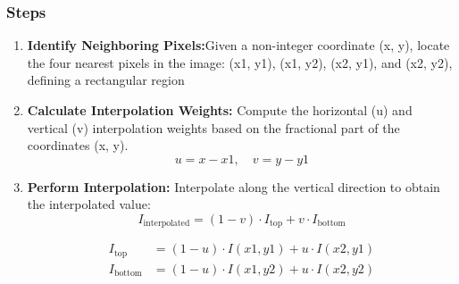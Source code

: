 \subsubsection{Steps}
\begin{enumerate}
    \item \textbf{Identify Neighboring Pixels:}Given a non-integer coordinate (x, y), locate the four nearest pixels in the image: (x1, y1), (x1, y2), (x2, y1), and (x2, y2), defining a rectangular region 

    \item \textbf{Calculate Interpolation Weights:} Compute the horizontal (u) and vertical (v) interpolation weights based on the fractional part of the coordinates (x, y).
        \[
    u = x - x1, \quad v = y - y1
    \]

    \item \textbf{Perform Interpolation:} Interpolate along the vertical direction to obtain the interpolated value:
    \[
    I_{\text{interpolated}} = (1 - v) \cdot I_{\text{top}} + v \cdot I_{\text{bottom}}
    \]

    \begin{align*}
    I_{\text{top}} & = (1 - u) \cdot I(x1, y1) + u \cdot I(x2, y1) \\
    I_{\text{bottom}} & = (1 - u) \cdot I(x1, y2) + u \cdot I(x2, y2)
    \end{align*}

    \end{enumerate}

